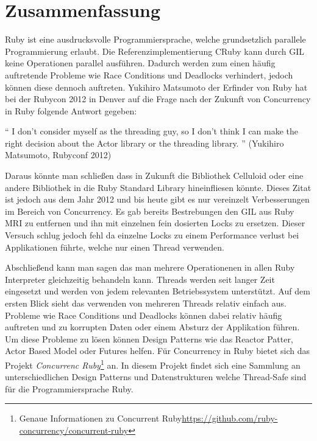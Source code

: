 \section{Zusammenfassung}
Ruby ist eine ausdrucksvolle Programmiersprache, welche grundsetzlich parallele Programmierung erlaubt. Die Referenzimplementierung CRuby kann durch GIL keine Operationen parallel ausführen. Dadurch werden zum einen häufig auftretende Probleme wie Race Conditions und Deadlocks verhindert, jedoch können diese dennoch auftreten. Yukihiro Matsumoto der Erfinder von Ruby hat bei der Rubycon 2012 in Denver auf die Frage nach der Zukunft von Concurrency in Ruby folgende Antwort gegeben:

	``
	I don't consider myself as the threading guy, so I don't think I can make the right decision about the Actor library or the threading library.
	'' (Yukihiro Matsumoto, Rubyconf 2012)

Daraus könnte man schließen dass in Zukunft die Bibliothek Celluloid oder eine andere Bibliothek in die Ruby Standard Library hineinfliesen könnte. Dieses Zitat ist jedoch aus dem Jahr 2012 und bis heute gibt es nur vereinzelt Verbesserungen im Bereich von Concurrency. Es gab bereits Bestrebungen den GIL aus Ruby MRI zu entfernen und ihn mit einzelnen fein dosierten Locks zu ersetzen. Dieser Versuch schlug jedoch fehl da einzelne Locks zu einem Performance verlust bei Applikationen führte, welche nur einen Thread verwenden. 

Abschließend kann man sagen das man mehrere Operationenen in allen Ruby Interpreter gleichzeitig behandeln kann. Threads werden seit langer Zeit eingesetzt und werden von jedem relevanten Betriebssystem unterstützt. Auf dem ersten Blick sieht das verwenden von mehreren Threads relativ einfach aus. Probleme wie Race Conditions und Deadlocks können dabei relativ häufig auftreten und zu korrupten Daten oder einem Absturz der Applikation führen. Um diese Probleme zu lösen können Design Patterns wie das Reactor Patter, Actor Based Model oder Futures helfen. Für Concurrency in Ruby bietet sich das Projekt \emph{Concurrenc Ruby}\footnote{Genaue Informationen zu Concurrent Ruby\url{https://github.com/ruby-concurrency/concurrent-ruby}} an. In diesem Projekt findet sich eine Sammlung an unterschiedlichen Design Patterns und Datenstrukturen welche Thread-Safe sind für die Programmiersprache Ruby.

